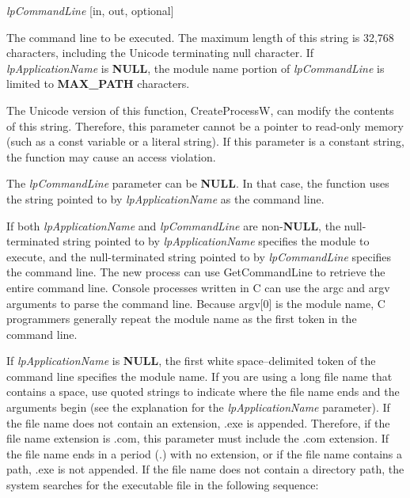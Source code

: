 \documentclass[a4paper]{book}
\newenvironment{customindent}[1]
{\begin{list}{}
	{\setlength{\leftmargin}{#1}}
    	\item[]
    }
{\end{list}}
\begin{document}
\noindent \textit{lpCommandLine} [in, out, optional]
\begin{customindent}{1cm}
    The command line to be executed. The maximum length of this string is 32,768 characters, including the Unicode terminating null character. If \textit{lpApplicationName} is \textbf{NULL}, the module name portion of \textit{lpCommandLine} is limited to \textbf{MAX\_PATH} characters.

    The Unicode version of this function, CreateProcessW, can modify the contents of this string. Therefore, this parameter cannot be a pointer to read-only memory (such as a const variable or a literal string). If this parameter is a constant string, the function may cause an access violation.

    The \textit{lpCommandLine} parameter can be \textbf{NULL}. In that case, the function uses the string pointed to by \textit{lpApplicationName} as the command line.

    If both \textit{lpApplicationName} and \textit{lpCommandLine} are non-\textbf{NULL}, the null-terminated string pointed to by \textit{lpApplicationName} specifies the module to execute, and the null-terminated string pointed to by \textit{lpCommandLine} specifies the command line. The new process can use GetCommandLine to retrieve the entire command line. Console processes written in C can use the argc and argv arguments to parse the command line. Because argv[0] is the module name, C programmers generally repeat the module name as the first token in the command line.

    If \textit{lpApplicationName} is \textbf{NULL}, the first white space–delimited token of the command line specifies the module name. If you are using a long file name that contains a space, use quoted strings to indicate where the file name ends and the arguments begin (see the explanation for the \textit{lpApplicationName} parameter). If the file name does not contain an extension, .exe is appended. Therefore, if the file name extension is .com, this parameter must include the .com extension. If the file name ends in a period (.) with no extension, or if the file name contains a path, .exe is not appended. If the file name does not contain a directory path, the system searches for the executable file in the following sequence:


\end{customindent}
\end{document}
